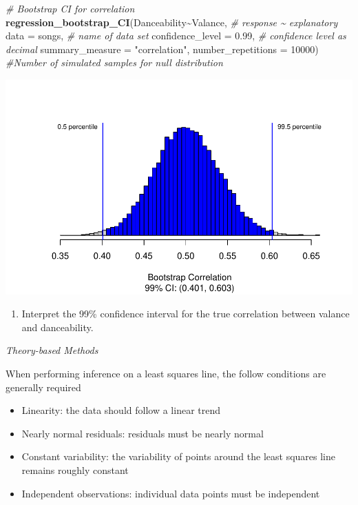 \documentclass[
]{report}
\newenvironment{Shaded}{\begin{snugshade}}{\end{snugshade}}
\newcommand{\AttributeTok}[1]{\textcolor[rgb]{0.13,0.29,0.53}{#1}}
\newcommand{\CommentTok}[1]{\textcolor[rgb]{0.56,0.35,0.01}{\textit{#1}}}
\newcommand{\DecValTok}[1]{\textcolor[rgb]{0.00,0.00,0.81}{#1}}
\newcommand{\FloatTok}[1]{\textcolor[rgb]{0.00,0.00,0.81}{#1}}
\newcommand{\FunctionTok}[1]{\textcolor[rgb]{0.13,0.29,0.53}{\textbf{#1}}}
\newcommand{\NormalTok}[1]{#1}
\newcommand{\SpecialCharTok}[1]{\textcolor[rgb]{0.81,0.36,0.00}{\textbf{#1}}}
\newcommand{\StringTok}[1]{\textcolor[rgb]{0.31,0.60,0.02}{#1}}
\providecommand{\tightlist}{%
  \setlength{\itemsep}{0pt}\setlength{\parskip}{0pt}}
\begin{document}
\begin{Shaded}
\begin{Highlighting}[]
\CommentTok{\# Bootstrap CI for correlation}
\FunctionTok{regression\_bootstrap\_CI}\NormalTok{(Danceability}\SpecialCharTok{\textasciitilde{}}\NormalTok{Valance, }\CommentTok{\# response \textasciitilde{} explanatory}
                        \AttributeTok{data =}\NormalTok{ songs, }\CommentTok{\# name of data set}
                        \AttributeTok{confidence\_level =} \FloatTok{0.99}\NormalTok{, }\CommentTok{\# confidence level as decimal}
                        \AttributeTok{summary\_measure =}  \StringTok{"correlation"}\NormalTok{, }
                        \AttributeTok{number\_repetitions =} \DecValTok{10000}\NormalTok{) }\CommentTok{\#Number of simulated samples for null distribution}
\end{Highlighting}
\end{Shaded}

\begin{center}\includegraphics[width=0.7\linewidth]{14-UR-module13_review_files/figure-latex/unnamed-chunk-6-1} \end{center}

\begin{enumerate}
\def\labelenumi{\arabic{enumi}.}
\setcounter{enumi}{10}
\tightlist
\item
  Interpret the 99\% confidence interval for the true correlation between valance and danceability.
\end{enumerate}

\newpage

\emph{Theory-based Methods}

When performing inference on a least squares line, the follow conditions are generally required

\begin{itemize}
\item
  Linearity: the data should follow a linear trend
\item
  Nearly normal residuals: residuals must be nearly normal
\item
  Constant variability: the variability of points around the least squares line remains roughly constant
\item
  Independent observations: individual data points must be independent
\end{itemize}
\end{document}
